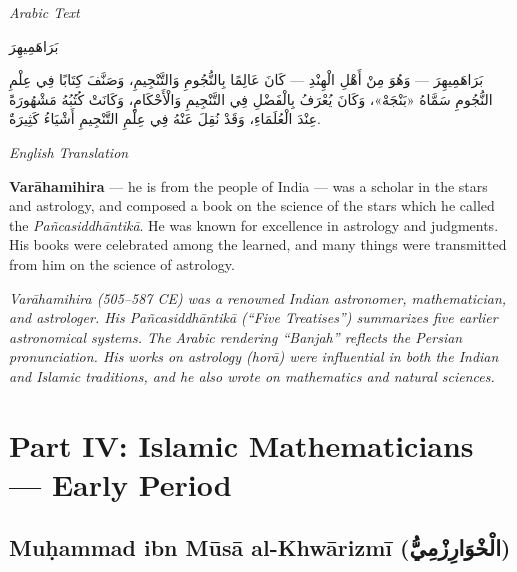\documentclass[11pt,a4paper]{article}
\def\RL#1{\beginR#1\endR}
\newcommand{\cnote}[1]{\textcolor{notecolor}{\textit{#1}}}
\newcommand{\textarabic}[1]{{\arabicfont\RL{#1}}}
\newenvironment{arabiccol}{%
  \begin{minipage}[t]{0.48\textwidth}%
  \begin{tcolorbox}[colback=leftbg,colframe=rulecolor,boxrule=0.4pt,arc=2pt,left=5pt,right=5pt,top=5pt,bottom=5pt]%
  \centering\textit{\footnotesize Arabic Text}\\[0.4em]%
  \raggedright\arabicfont\small%
}{%
  \end{tcolorbox}%
  \end{minipage}%
}
\newenvironment{englishcol}{%
  \begin{minipage}[t]{0.48\textwidth}%
  \begin{tcolorbox}[colback=rightbg,colframe=rulecolor,boxrule=0.4pt,arc=2pt,left=5pt,right=5pt,top=5pt,bottom=5pt]%
  \centering\textit{\footnotesize English Translation}\\[0.4em]%
  \raggedright\small%
}{%
  \end{tcolorbox}%
  \end{minipage}%
}
\begin{document}
\noindent
\begin{arabiccol}
\beginR
بَرَاهَمِيهِرَ

بَرَاهَمِيهِرَ — وَهُوَ مِنْ أَهْلِ الْهِنْدِ — كَانَ عَالِمًا بِالنُّجُومِ وَالتَّنْجِيمِ، وَصَنَّفَ كِتَابًا فِي عِلْمِ النُّجُومِ سَمَّاهُ «بَنْجَهْ»، وَكَانَ يُعْرَفُ بِالْفَضْلِ فِي التَّنْجِيمِ وَالْأَحْكَامِ، وَكَانَتْ كُتُبُهُ مَشْهُورَةً عِنْدَ الْعُلَمَاءِ، وَقَدْ نُقِلَ عَنْهُ فِي عِلْمِ التَّنْجِيمِ أَشْيَاءُ كَثِيرَةٌ.
\endR
\end{arabiccol}
\hfill
\begin{englishcol}
\textbf{Varāhamihira} --- he is from the people of India --- was a scholar in the stars and astrology, and composed a book on the science of the stars which he called the \textit{Pañcasiddhāntikā}. He was known for excellence in astrology and judgments. His books were celebrated among the learned, and many things were transmitted from him on the science of astrology.

\cnote{Varāhamihira (505--587 CE) was a renowned Indian astronomer, mathematician, and astrologer. His \textit{Pañcasiddhāntikā} (``Five Treatises'') summarizes five earlier astronomical systems. The Arabic rendering ``Banjah'' reflects the Persian pronunciation. His works on astrology (\textit{horā}) were influential in both the Indian and Islamic traditions, and he also wrote on mathematics and natural sciences.}
\end{englishcol}

\par\vspace{0.5em}

\newpage

\section{Part IV: Islamic Mathematicians --- Early Period}
\label{sec:islamic-early}

\subsection{Muḥammad ibn Mūsā al-Khwārizmī (\textarabic{الْخْوَارِزْمِيُّ})}
\end{document}
